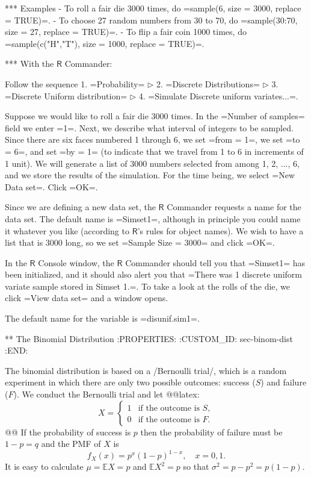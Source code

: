 *** Examples
- To roll a fair die 3000 times, do =sample(6, size = 3000, replace = TRUE)=.
- To choose 27 random numbers from 30 to 70, do =sample(30:70, size = 27, replace = TRUE)=.
- To flip a fair coin 1000 times, do =sample(c("H","T"), size = 1000, replace = TRUE)=.

*** With the \(\mathsf{R}\) Commander:

Follow the sequence 
1. =Probability= \(\triangleright\) 
2. =Discrete Distributions= \(\triangleright\) 
3. =Discrete Uniform distribution= \(\triangleright\) 
4. =Simulate Discrete uniform variates...=.

Suppose we would like to roll a fair die 3000 times. In the =Number of
samples= field we enter =1=. Next, we describe what interval of
integers to be sampled. Since there are six faces numbered 1 through
6, we set =from = 1=, we set =to = 6=, and set =by = 1= (to indicate
that we travel from 1 to 6 in increments of 1 unit). We will generate
a list of 3000 numbers selected from among 1, 2, ..., 6, and we store
the results of the simulation. For the time being, we select =New Data
set=. Click =OK=.

Since we are defining a new data set, the \(\mathsf{R}\) Commander
requests a name for the data set. The default name is =Simset1=,
although in principle you could name it whatever you like (according
to \(\mathsf{R}\)'s rules for object names). We wish to have a list
that is 3000 long, so we set =Sample Size = 3000= and click =OK=.

In the \(\mathsf{R}\) Console window, the \(\mathsf{R}\) Commander
should tell you that =Simset1= has been initialized, and it should
also alert you that =There was 1 discrete uniform variate sample
stored in Simset 1.=. To take a look at the rolls of the die, we click
=View data set= and a window opens.

The default name for the variable is =disunif.sim1=.

** The Binomial Distribution
:PROPERTIES:
:CUSTOM_ID: sec-binom-dist
:END:

The binomial distribution is based on a /Bernoulli trial/, which is a
random experiment in which there are only two possible outcomes:
success (\(S\)) and failure (\(F\)). We conduct the Bernoulli trial
and let @@latex:\begin{equation} X = \begin{cases} 1 & \mbox{if the outcome is $S$},\\ 0 & \mbox{if the outcome is $F$}. \end{cases} \end{equation}@@
If the probability of success is \(p\) then the probability of failure
must be \(1-p=q\) and the PMF of \(X\) is
\begin{equation}
f_{X}(x)=p^{x}(1-p)^{1-x},\quad x=0,1.
\end{equation}
It is easy to calculate \(\mu=\mathbb{E} X=p\) and \(\mathbb{E}
X^{2}=p\) so that \(\sigma^{2}=p-p^{2}=p(1-p)\).

